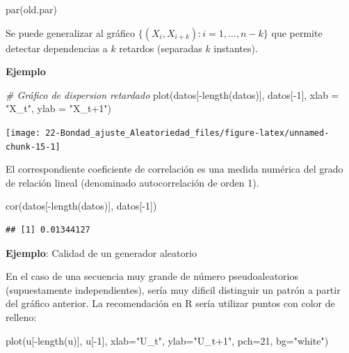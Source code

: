 \documentclass[
]{book}
\newenvironment{Shaded}{\begin{snugshade}}{\end{snugshade}}
\newcommand{\AttributeTok}[1]{\textcolor[rgb]{0.77,0.63,0.00}{#1}}
\newcommand{\CommentTok}[1]{\textcolor[rgb]{0.56,0.35,0.01}{\textit{#1}}}
\newcommand{\DecValTok}[1]{\textcolor[rgb]{0.00,0.00,0.81}{#1}}
\newcommand{\FunctionTok}[1]{\textcolor[rgb]{0.00,0.00,0.00}{#1}}
\newcommand{\NormalTok}[1]{#1}
\newcommand{\SpecialCharTok}[1]{\textcolor[rgb]{0.00,0.00,0.00}{#1}}
\newcommand{\StringTok}[1]{\textcolor[rgb]{0.31,0.60,0.02}{#1}}
\theoremstyle{break}
\theoremstyle{nonumberplain}
\begin{document}
\begin{Shaded}
\begin{Highlighting}[]
\FunctionTok{par}\NormalTok{(old.par)}
\end{Highlighting}
\end{Shaded}

Se puede generalizar al gráfico \(\{(X_{i},X_{i+k}) : i = 1, \ldots, n-k \}\)
que permite detectar dependencias a \(k\) retardos
(separadas \(k\) instantes).

\textbf{Ejemplo}

\begin{Shaded}
\begin{Highlighting}[]
\CommentTok{\# Gráfico de dispersion retardado}
\FunctionTok{plot}\NormalTok{(datos[}\SpecialCharTok{{-}}\FunctionTok{length}\NormalTok{(datos)], datos[}\SpecialCharTok{{-}}\DecValTok{1}\NormalTok{], }\AttributeTok{xlab =} \StringTok{"X\_t"}\NormalTok{, }\AttributeTok{ylab =} \StringTok{"X\_t+1"}\NormalTok{)}
\end{Highlighting}
\end{Shaded}

\begin{center}\texttt{[image: 22-Bondad\_ajuste\_Aleatoriedad\_files/figure-latex/unnamed-chunk-15-1]} \end{center}

El correspondiente coeficiente de correlación es una medida numérica
del grado de relación lineal (denominado autocorrelación de orden 1).

\begin{Shaded}
\begin{Highlighting}[]
\FunctionTok{cor}\NormalTok{(datos[}\SpecialCharTok{{-}}\FunctionTok{length}\NormalTok{(datos)], datos[}\SpecialCharTok{{-}}\DecValTok{1}\NormalTok{])}
\end{Highlighting}
\end{Shaded}

\begin{verbatim}
## [1] 0.01344127
\end{verbatim}

\textbf{Ejemplo}: Calidad de un generador aleatorio

En el caso de una secuencia muy grande de número pseudoaleatorios (supuestamente independientes), sería muy dificil distinguir un patrón a partir del gráfico anterior. La recomendación en R sería utilizar puntos con color de relleno:

\begin{Shaded}
\begin{Highlighting}[]
\FunctionTok{plot}\NormalTok{(u[}\SpecialCharTok{{-}}\FunctionTok{length}\NormalTok{(u)], u[}\SpecialCharTok{{-}}\DecValTok{1}\NormalTok{], }\AttributeTok{xlab=}\StringTok{"U\_t"}\NormalTok{, }\AttributeTok{ylab=}\StringTok{"U\_t+1"}\NormalTok{, }\AttributeTok{pch=}\DecValTok{21}\NormalTok{, }\AttributeTok{bg=}\StringTok{"white"}\NormalTok{)}
\end{Highlighting}
\end{Shaded}
\end{document}
